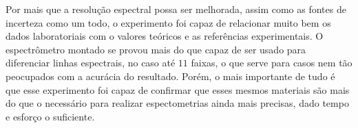 Por mais que a resolução espectral possa ser melhorada, assim como as fontes de incerteza como um todo, o experimento foi capaz de relacionar muito bem os dados laboratoriais com o valores teóricos e as referências experimentais. O espectrômetro montado se provou mais do que capaz de ser usado para diferenciar linhas espectrais, no caso até $11$ faixas, o que serve para casos nem tão peocupados com a acurácia do resultado. Porém, o mais importante de tudo é que esse experimento foi capaz de confirmar que esses mesmos materiais são mais do que o necessário para realizar espectometrias ainda mais precisas, dado tempo e esforço o suficiente.